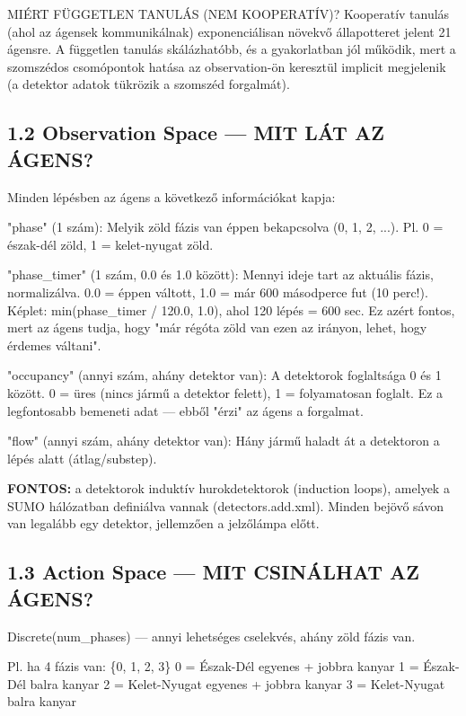 \documentclass[11pt,a4paper]{article}
\begin{document}
MIÉRT FÜGGETLEN TANULÁS (NEM KOOPERATÍV)?
Kooperatív tanulás (ahol az ágensek kommunikálnak) exponenciálisan
növekvő állapotteret jelent 21 ágensre. A független tanulás
skálázhatóbb, és a gyakorlatban jól működik, mert a szomszédos
csomópontok hatása az observation-ön keresztül implicit megjelenik
(a detektor adatok tükrözik a szomszéd forgalmát).

\subsection*{1.2 Observation Space — MIT LÁT AZ ÁGENS?}
Minden lépésben az ágens a következő információkat kapja:

"phase" (1 szám):
Melyik zöld fázis van éppen bekapcsolva (0, 1, 2, ...).
Pl. 0 = észak-dél zöld, 1 = kelet-nyugat zöld.

"phase\_timer" (1 szám, 0.0 és 1.0 között):
Mennyi ideje tart az aktuális fázis, normalizálva.
0.0 = éppen váltott, 1.0 = már 600 másodperce fut (10 perc!).
Képlet: min(phase\_timer / 120.0, 1.0), ahol 120 lépés = 600 sec.
Ez azért fontos, mert az ágens tudja, hogy "már régóta zöld van
ezen az irányon, lehet, hogy érdemes váltani".

"occupancy" (annyi szám, ahány detektor van):
A detektorok foglaltsága 0 és 1 között.
0 = üres (nincs jármű a detektor felett), 1 = folyamatosan foglalt.
Ez a legfontosabb bemeneti adat — ebből "érzi" az ágens a forgalmat.

"flow" (annyi szám, ahány detektor van):
Hány jármű haladt át a detektoron a lépés alatt (átlag/substep).

\textbf{FONTOS:} a detektorok induktív hurokdetektorok (induction loops), amelyek
a SUMO hálózatban definiálva vannak (detectors.add.xml). Minden bejövő
sávon van legalább egy detektor, jellemzően a jelzőlámpa előtt.

\subsection*{1.3 Action Space — MIT CSINÁLHAT AZ ÁGENS?}
Discrete(num\_phases) — annyi lehetséges cselekvés, ahány zöld fázis van.

Pl. ha 4 fázis van: \{0, 1, 2, 3\}
0 = Észak-Dél egyenes + jobbra kanyar
1 = Észak-Dél balra kanyar
2 = Kelet-Nyugat egyenes + jobbra kanyar
3 = Kelet-Nyugat balra kanyar
\end{document}
